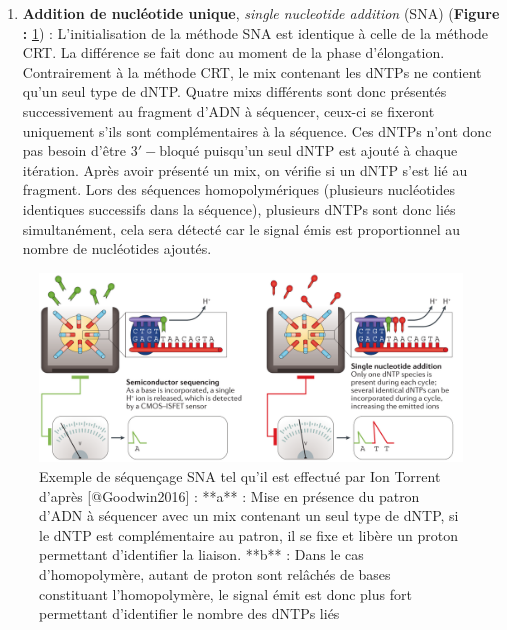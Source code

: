 \documentclass[12pt,twoside]{reedthesis}
\providecommand{\tightlist}{%
  \setlength{\itemsep}{0pt}\setlength{\parskip}{0pt}}
\theoremstyle{definition}
\theoremstyle{definition}
\theoremstyle{remark}
\begin{document}
  \begin{enumerate}
  \def\labelenumi{\alph{enumi}.}
  \setcounter{enumi}{1}
  \tightlist
  \item
    \textbf{Addition de nucléotide unique}, \emph{single nucleotide
    addition} (SNA) (\textbf{Figure : }\ref{fig:snaSeq}) :
    L'initialisation de la méthode SNA est identique à celle de la méthode
    CRT. La différence se fait donc au moment de la phase d'élongation.
    Contrairement à la méthode CRT, le mix contenant les dNTPs ne contient
    qu'un seul type de dNTP. Quatre mixs différents sont donc présentés
    successivement au fragment d'ADN à séquencer, ceux-ci se fixeront
    uniquement s'ils sont complémentaires à la séquence. Ces dNTPs n'ont
    donc pas besoin d'être \(\mathrm{3'-bloqué}\) puisqu'un seul dNTP est
    ajouté à chaque itération. Après avoir présenté un mix, on vérifie si
    un dNTP s'est lié au fragment. Lors des séquences homopolymériques
    (plusieurs nucléotides identiques successifs dans la séquence),
    plusieurs dNTPs sont donc liés simultanément, cela sera détecté car le
    signal émis est proportionnel au nombre de nucléotides ajoutés.
  \end{enumerate}
  
  \begin{figure}
  
  {\centering \includegraphics[scale=.26]{figure/SNA_seq_ionTorrent} 
  
  }
  
  \caption[Exemple de séquençage SNA tel qu'il est effectué par Ion Torrent]{Exemple de séquençage SNA tel qu'il est effectué par Ion Torrent d'après [@Goodwin2016] : **a** : Mise en présence du patron d'ADN à séquencer avec un mix contenant un seul type de dNTP, si le dNTP est complémentaire au patron, il se fixe et libère un proton permettant d'identifier la liaison. **b** : Dans le cas d'homopolymère, autant de proton sont relâchés de bases constituant l'homopolymère, le signal émit est donc plus fort permettant d'identifier le nombre des dNTPs liés}\label{fig:snaSeq}
  \end{figure}
  
\end{document}
